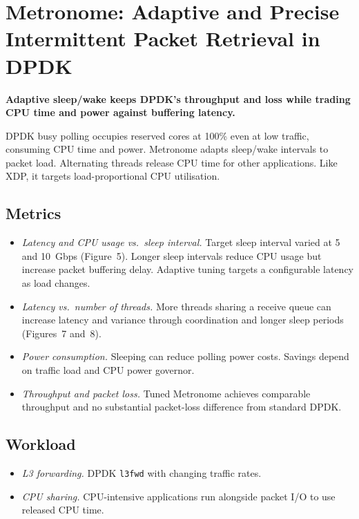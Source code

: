 \documentclass[11pt,a4paper]{article}
\newcommand{\finding}[1]{\textbf{#1}\par\smallskip}
\begin{document}
\section*{\large\normalfont Metronome: Adaptive and Precise Intermittent Packet Retrieval in DPDK~\cite{metronome2023}}
\finding{Adaptive sleep/wake keeps DPDK's throughput and loss while trading CPU time and power against buffering latency.}
DPDK busy polling occupies reserved cores at 100\% even at low traffic, consuming CPU time and power.
Metronome adapts sleep/wake intervals to packet load.
Alternating threads release CPU time for other applications.
Like XDP, it targets load-proportional CPU utilisation.

\subsection*{\normalsize\normalfont Metrics}
\begin{itemize}
\setlength{\itemsep}{2pt}
\item \emph{Latency and CPU usage vs.\ sleep interval.}
Target sleep interval varied at 5 and 10~Gbps (Figure~5).
Longer sleep intervals reduce CPU usage but increase packet buffering delay.
Adaptive tuning targets a configurable latency as load changes.

\item \emph{Latency vs.\ number of threads.}
More threads sharing a receive queue can increase latency and variance through coordination and longer sleep periods (Figures~7 and~8).

\item \emph{Power consumption.}
Sleeping can reduce polling power costs.
Savings depend on traffic load and CPU power governor.

\item \emph{Throughput and packet loss.}
Tuned Metronome achieves comparable throughput and no substantial packet-loss difference from standard DPDK.
\end{itemize}

\subsection*{\normalsize\normalfont Workload}
\begin{itemize}
\setlength{\itemsep}{2pt}
\item \emph{L3 forwarding.}
DPDK \texttt{l3fwd} with changing traffic rates.
\item \emph{CPU sharing.}
CPU-intensive applications run alongside packet I/O to use released CPU time.
\end{itemize}
\end{document}
